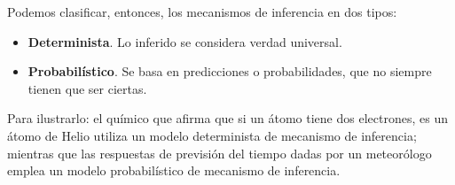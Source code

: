 \documentclass[a4paper, 11pt, titlepage]{article}
\begin{document}
        Podemos clasificar, entonces, los mecanismos de inferencia en dos tipos:

        \begin{itemize}
            \item \textbf{Determinista}. Lo inferido se considera verdad universal.
            \item \textbf{Probabilístico}. Se basa en predicciones o probabilidades, que no 
            siempre tienen que ser ciertas.
        \end{itemize}

        Para ilustrarlo: el químico que afirma que si un átomo tiene dos electrones, es un 
        átomo de Helio utiliza un modelo determinista de mecanismo de inferencia; mientras que 
        las respuestas de previsión del tiempo dadas por un meteorólogo emplea un modelo probabilístico 
        de mecanismo de inferencia.
\end{document}
